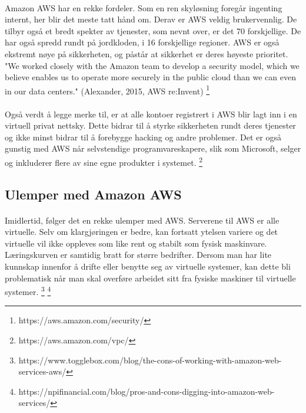 \paragraph{}Amazon AWS har en rekke fordeler. Som en ren skyløsning foregår ingenting internt, her blir det meste tatt hånd om. Derav er AWS veldig brukervennlig. De tilbyr også et bredt spekter av tjenester, som nevnt over, er det 70 forskjellige. De har også spredd rundt på jordkloden, i 16 forskjellige regioner. AWS er også ekstremt nøye på sikkerheten, og påstår at sikkerhet er deres høyeste prioritet. "We worked closely with the Amazon team to develop a security model, which we believe enables us to operate more securely in the public cloud than we can even in our data centers." (Alexander, 2015, AWS re:Invent)
\footnote{https://aws.amazon.com/security/}

\paragraph{} Også verdt å legge merke til, er at alle kontoer registrert i AWS blir lagt inn i en virtuell privat nettsky. Dette bidrar til å styrke sikkerheten rundt deres tjenester og ikke minst bidrar til å forebygge hacking og andre problemer. Det er også gunstig med AWS når selvstendige programvareskapere, slik som Microsoft, selger og inkluderer flere av sine egne produkter i systemet.
\footnote{https://aws.amazon.com/vpc/}

\subsection{Ulemper med Amazon AWS}
\paragraph{} Imidlertid, følger det en rekke ulemper med AWS. Serverene til AWS er alle virtuelle. Selv om klargjøringen er bedre, kan fortsatt ytelsen variere og det virtuelle vil ikke oppleves som like rent og stabilt som fysisk maskinvare. Læringskurven er samtidig bratt for større bedrifter. Dersom man har lite kunnskap innenfor å drifte eller benytte seg av virtuelle systemer, kan dette bli problematisk når man skal overføre arbeidet sitt fra fysiske maskiner til virtuelle systemer. 
\footnote{https://www.togglebox.com/blog/the-cons-of-working-with-amazon-web-services-aws/}
\footnote{https://npifinancial.com/blog/pros-and-cons-digging-into-amazon-web-services/}


